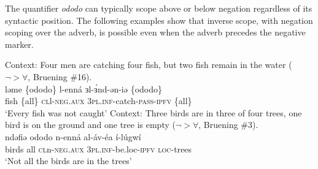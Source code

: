 






The quantifier \textit{ododo} can typically scope above or below negation regardless of its syntactic position.  The following examples show that inverse scope, with negation scoping over the adverb, is possible even when the adverb precedes the negative marker.  %

\ea
	\ea Context: Four men are catching four fish, but two fish remain in the water ($\neg > \forall $, Bruening \#16).\\
	\gll ləme \{ododo\} l-enná ɜl-ɜ́nd-ən-iə \{ododo\}		\\
		 fish \{all\}	\textsc{cl}l-\textsc{neg.aux} 3\textsc{pl.inf}-catch-\textsc{pass}-\textsc{\textsc{ipfv}} \{all\}\\
	\glt ‘Every fish was not caught’
	\ex Context: Three birds are in three of four trees, one bird is on the ground and one tree is empty ($\neg > \forall $, Bruening \#3).\\
	\gll ndəfiə ododo n-enná al-áv-éa í-lúgwí		\\
		 birds all	\textsc{cl}n-\textsc{neg.aux} 3\textsc{pl.inf}-be.loc-\textsc{ipfv} \textsc{loc}-trees \\
	\glt ‘Not all the birds are in the trees’
	\z
\z





